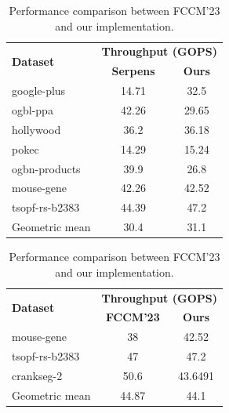 \documentclass[manuscript,screen,review]{acmart}
\begin{document}
\begin{table}[h!]
	\centering
	\begin{minipage}{0.45\textwidth}
		\centering
		\begin{tabular}{|l|c|c|}
			\hline
			\multirow{2}{*}{\textbf{Dataset}} & \multicolumn{2}{c|}{\textbf{Throughput (GOPS)}} \\
			\cline{2-3}
			& \textbf{Serpens} & \textbf{Ours} \\
			\hline
			google-plus & 14.71 & 32.5 \\
			ogbl-ppa & 42.26 & 29.65 \\
			hollywood & 36.2 & 36.18 \\
			pokec & 14.29 & 15.24 \\
			ogbn-products & 39.9 & 26.8 \\
			mouse-gene & 42.26 & 42.52 \\
			tsopf-rs-b2383 & 44.39 & 47.2 \\
			\hline
			Geometric mean & 30.4 & 31.1 \\
			\hline
		\end{tabular}
		\caption{Performance comparison between Serpens and our implementation.}
		\label{serpens}
	\end{minipage}
	\hfill
	\begin{minipage}{0.45\textwidth}
		\centering
		\begin{tabular}{|l|c|c|}
			\hline
			\multirow{2}{*}{\textbf{Dataset}} & \multicolumn{2}{c|}{\textbf{Throughput (GOPS)}} \\
			\cline{2-3}
			& \textbf{FCCM'23} & \textbf{Ours} \\
			\hline
			mouse-gene & 38 & 42.52 \\
			tsopf-rs-b2383 & 47 & 47.2 \\
			crankseg-2 & 50.6 & 43.6491 \\
			\hline
			Geometric mean & 44.87 & 44.1 \\
			\hline
		\end{tabular}
		\caption{Performance comparison between FCCM'23 and our implementation.}
		\label{fccm}
	\end{minipage}
\end{table}
\end{document}
